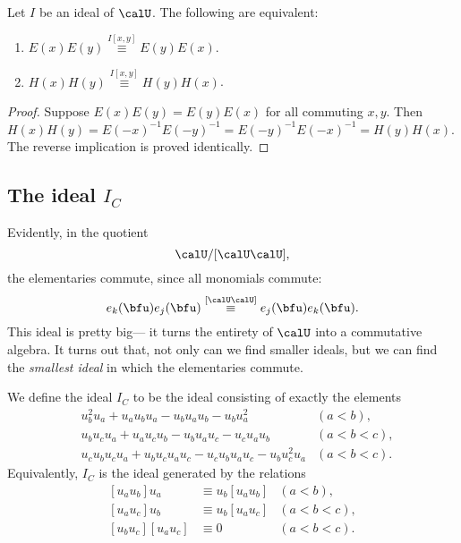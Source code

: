 \documentclass{article}
\begin{document}
\begin{corollary}
    \label{corr:ECommutesIffHCommutes}
    Let $I$ be an ideal of $\calU$.
    The following are equivalent:
    \begin{enumerate}[label=(\alph*)]
        \item 
            $E(x)E(y) \overset{I[x,y]}{\equiv} E(y)E(x)$. 
        \item 
            $H(x)H(y) \overset{I[x,y]}{\equiv} H(y)H(x)$.
    \end{enumerate}
\end{corollary}

\begin{proof}
    Suppose $E(x)E(y) = E(y)E(x)$ for all commuting $x,y$.
    Then $H(x)H(y) = E(-x)^{-1}E(-y)^{-1} = E(-y)^{-1}E(-x)^{-1} = H(y)H(x)$.
    The reverse implication is proved identically.
\end{proof}

\subsection{
    The ideal $I_C$
}

Evidently, in the quotient
\[
    \calU / [\calU\calU],
\]
the elementaries commute, since all monomials commute:
\[
    e_k(\bfu)e_j(\bfu) 
    \overset{[\calU\calU]}{\equiv} 
    e_j(\bfu)e_k(\bfu).
\]
This ideal is pretty big--- it turns the entirety of $\calU$ into a commutative algebra.
It turns out that, not only can we find smaller ideals, but we can find the \textit{smallest ideal} in which the elementaries commute.

\begin{definition}
    We define the ideal $I_C$ to be the ideal consisting of exactly the elements
    \begin{align}
        &
        u_b^2u_a + u_au_bu_a - u_bu_au_b - u_bu_a^2 
        &
        (a<b),
        \\
        &
        u_bu_cu_a + u_au_cu_b - u_bu_au_c - u_cu_au_b
        &
        (a<b<c),
        \\
        &
        u_cu_bu_cu_a + u_bu_cu_au_c - u_cu_bu_au_c - u_bu_c^2u_a
        &
        (a<b<c).
    \end{align}
    Equivalently, $I_C$ is the ideal generated by the relations
    \begin{align}
        \label{eqn:I_C1}
        [u_au_b]u_a 
        &\equiv 
        u_b[u_au_b]
        &
        (a<b),
        \\
        \label{eqn:I_C2}
        [u_au_c]u_b 
        &\equiv 
        u_b[u_au_c]
        &
        (a<b<c),
        \\
        \label{eqn:I_C3}
        [u_bu_c][u_au_c] 
        &\equiv 
        0
        &
        (a<b<c).
    \end{align}
\end{definition}
\end{document}
